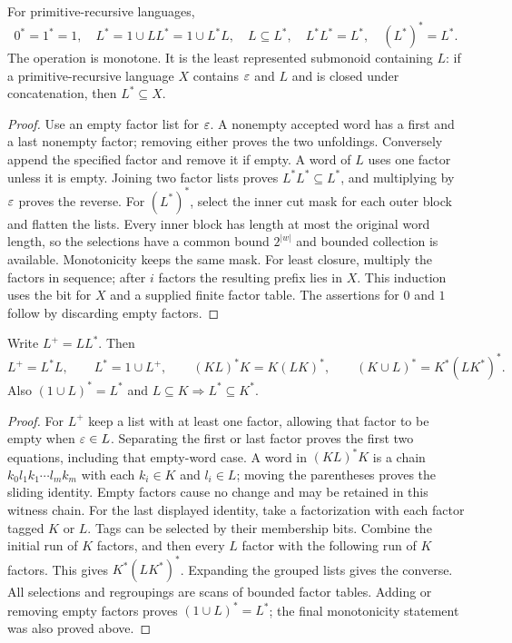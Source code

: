 \begin{theorem}\label{alg:star}
For primitive-recursive languages,
\[
 0^*=1^*=1,\quad L^*=1\cup LL^*=1\cup L^*L,\quad
 L\subseteq L^*,\quad L^*L^*=L^*,\quad (L^*)^*=L^*.
\]
The operation is monotone. It is the least represented submonoid containing
$L$: if a primitive-recursive language $X$ contains $\varepsilon$ and $L$ and
is closed under concatenation, then $L^*\subseteq X$.
\end{theorem}
\begin{proof}
Use an empty factor list for $\varepsilon$. A nonempty accepted word has a
first and a last nonempty factor; removing either proves the two unfoldings.
Conversely append the specified factor and remove it if empty. A word of
$L$ uses one factor unless it is empty. Joining two factor lists proves
$L^*L^*\subseteq L^*$, and multiplying by $\varepsilon$ proves the reverse.
For $(L^*)^*$, select the inner cut mask for each outer block and flatten
the lists. Every inner block has length at most the original word length,
so the selections have a common bound $2^{|w|}$ and bounded collection
is available. Monotonicity keeps the same mask. For least closure,
multiply the factors in sequence; after $i$ factors the resulting prefix
lies in $X$. This induction uses the bit for $X$ and a supplied finite
factor table. The assertions for $0$ and $1$ follow by discarding empty
factors.
\end{proof}

\begin{proposition}\label{alg:identities}
Write $L^+=LL^*$. Then
\[
 L^+=L^*L,\qquad L^*=1\cup L^+,\qquad
 (KL)^*K=K(LK)^*,\qquad
 (K\cup L)^*=K^*(LK^*)^*.
\]
Also $(1\cup L)^*=L^*$ and $L\subseteq K\Rightarrow L^*\subseteq K^*$.
\end{proposition}
\begin{proof}
For $L^+$ keep a list with at least one factor, allowing that factor to be
empty when $\varepsilon\in L$. Separating the first or last factor proves the
first two equations, including that empty-word case. A word in
$(KL)^*K$ is a chain $k_0l_1k_1\cdots l_mk_m$ with each $k_i\in K$
and $l_i\in L$; moving the parentheses proves the sliding identity.
Empty factors cause no change and may be retained in this witness chain.
For the last displayed identity, take a factorization with each factor
tagged $K$ or $L$. Tags can be selected by their membership bits. Combine
the initial run of $K$ factors, and then every $L$ factor with the following
run of $K$ factors. This gives $K^*(LK^*)^*$. Expanding the grouped lists
gives the converse. All selections and regroupings are scans of bounded
factor tables. Adding or removing empty factors proves $(1\cup L)^*=L^*$;
the final monotonicity statement was also proved above.
\end{proof}

